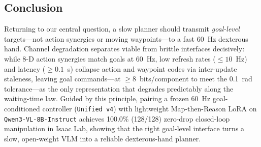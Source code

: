 \subsection{Conclusion}
Returning to our central question, a slow planner should transmit \emph{goal-level} targets---not action synergies or moving waypoints---to a fast 60~Hz dexterous hand.
Channel degradation separates viable from brittle interfaces decisively: while 8-D action synergies match goals at 60~Hz, low refresh rates ($\le 10$~Hz) and latency ($\ge 0.1$~s) collapse action and waypoint codes via inter-update staleness, leaving goal commands---at $\ge 8$~bits/component to meet the 0.1~rad tolerance---as the only representation that degrades predictably along the waiting-time law.
Guided by this principle, pairing a frozen 60~Hz goal-conditioned controller (\texttt{Unified v4}) with lightweight Map-then-Reason LoRA on \texttt{Qwen3-VL-8B-Instruct} achieves 100.0\% (128/128) zero-drop closed-loop manipulation in Isaac Lab, showing that the right goal-level interface turns a slow, open-weight VLM into a reliable dexterous-hand planner.
